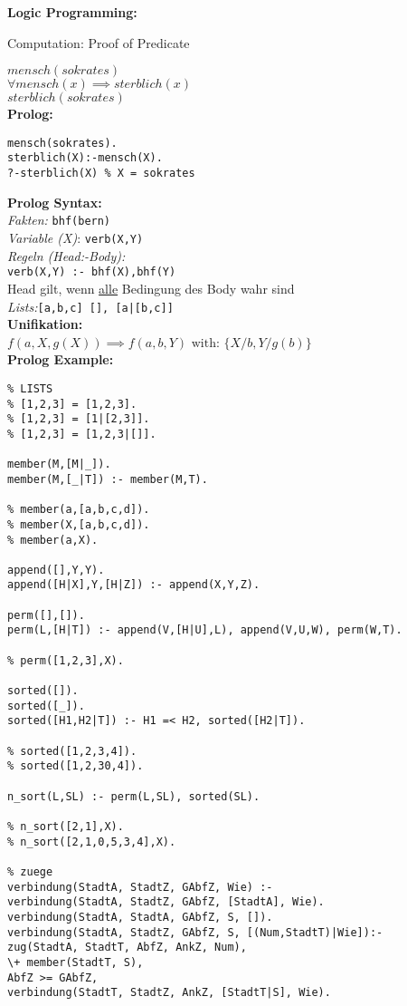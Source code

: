 \begin{breakbox}
\textbf{Logic Programming:}
\begin{center} Computation: Proof of Predicate \end{center}
$mensch(sokrates)$ \\
$\forall mensch(x) \implies sterblich(x)$ \\
$sterblich(sokrates)$\\

\textbf{Prolog:}
\vspace{-5mm}
\begin{verbatim}
mensch(sokrates).
sterblich(X):-mensch(X).
?-sterblich(X) % X = sokrates
\end{verbatim}
\textbf{Prolog Syntax:}\\
\emph{Fakten:} \texttt{bhf(bern)}\\
\emph{Variable (X)}: \texttt{verb(X,Y)}\\
\emph{Regeln (Head:-Body):}\\ \texttt{verb(X,Y) :- bhf(X),bhf(Y)}\\
Head gilt, wenn \underline{alle} Bedingung des Body wahr sind\\
\emph{Lists:}\texttt{[a,b,c] [], [a|[b,c]]}\\

\textbf{Unifikation:}\\
$f(a,X,g(X)) \implies f(a,b,Y)$ 
$\text{with: } \{X/b, Y/g(b)\}$\\

\textbf{Prolog Example:}\\
\vspace{-5mm}
\begin{verbatim}
% LISTS
% [1,2,3] = [1,2,3].
% [1,2,3] = [1|[2,3]].
% [1,2,3] = [1,2,3|[]].

member(M,[M|_]).
member(M,[_|T]) :- member(M,T).

% member(a,[a,b,c,d]).
% member(X,[a,b,c,d]).
% member(a,X).

append([],Y,Y).
append([H|X],Y,[H|Z]) :- append(X,Y,Z).

perm([],[]).
perm(L,[H|T]) :- append(V,[H|U],L), append(V,U,W), perm(W,T).

% perm([1,2,3],X).

sorted([]).
sorted([_]).
sorted([H1,H2|T]) :- H1 =< H2, sorted([H2|T]).

% sorted([1,2,3,4]).
% sorted([1,2,30,4]).

n_sort(L,SL) :- perm(L,SL), sorted(SL).

% n_sort([2,1],X).
% n_sort([2,1,0,5,3,4],X).

% zuege
verbindung(StadtA, StadtZ, GAbfZ, Wie) :-
verbindung(StadtA, StadtZ, GAbfZ, [StadtA], Wie).
verbindung(StadtA, StadtA, GAbfZ, S, []).
verbindung(StadtA, StadtZ, GAbfZ, S, [(Num,StadtT)|Wie]):-
zug(StadtA, StadtT, AbfZ, AnkZ, Num),
\+ member(StadtT, S),
AbfZ >= GAbfZ,
verbindung(StadtT, StadtZ, AnkZ, [StadtT|S], Wie).
\end{verbatim}
\end{breakbox}

